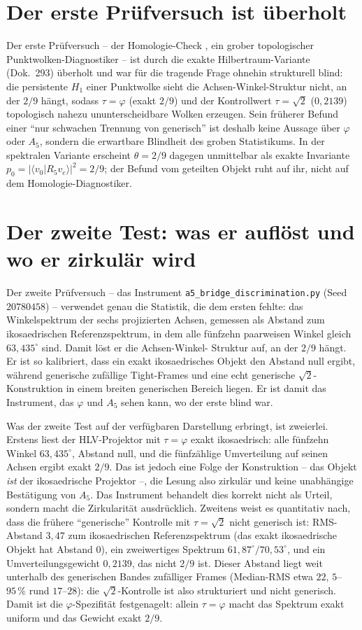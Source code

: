 \section{Der erste Prüfversuch ist überholt}
Der erste Prüfversuch -- der Homologie-Check , ein
grober topologischer Punktwolken-Diagnostiker -- ist durch die exakte Hilbertraum-Variante
(Dok.~293) überholt und war für die tragende Frage ohnehin strukturell blind: die persistente
$H_1$ einer Punktwolke sieht die Achsen-Winkel-Struktur nicht, an der $2/9$ hängt, sodass
$\tau=\varphi$ (exakt $2/9$) und der Kontrollwert $\tau=\sqrt2$ ($0{,}2139$) topologisch nahezu
ununterscheidbare Wolken erzeugen. Sein früherer Befund einer \enquote{nur schwachen Trennung
von generisch} ist deshalb keine Aussage über $\varphi$ oder $A_5$, sondern die erwartbare
Blindheit des groben Statistikums. In der spektralen Variante erscheint $\theta=2/9$ dagegen
unmittelbar als exakte Invariante $p_0=\lvert\langle v_0|R_5 v_e\rangle\rvert^2=2/9$; der Befund
vom geteilten Objekt ruht auf ihr, nicht auf dem Homologie-Diagnostiker.

\section{Der zweite Test: was er auflöst und wo er zirkulär wird}
Der zweite Prüfversuch -- das Instrument \texttt{a5\_bridge\_discrimination.py}
(Seed $20780458$) -- verwendet genau die Statistik, die dem ersten fehlte: das Winkelspektrum
der sechs projizierten Achsen, gemessen als Abstand zum ikosaedrischen Referenzspektrum, in dem
alle fünfzehn paarweisen Winkel gleich $63{,}435^\circ$ sind. Damit löst er die Achsen-Winkel-
Struktur auf, an der $2/9$ hängt. Er ist so kalibriert, dass ein exakt ikosaedrisches Objekt den
Abstand null ergibt, während generische zufällige Tight-Frames und eine echt generische
$\sqrt2$-Konstruktion in einem breiten generischen Bereich liegen. Er ist damit das Instrument,
das $\varphi$ und $A_5$ sehen kann, wo der erste blind war.

Was der zweite Test auf der verfügbaren Darstellung erbringt, ist zweierlei. Erstens liest der
HLV-Projektor mit $\tau=\varphi$ exakt ikosaedrisch: alle fünfzehn Winkel $63{,}435^\circ$,
Abstand null, und die fünfzählige Umverteilung auf seinen Achsen ergibt exakt $2/9$. Das ist
jedoch eine Folge der Konstruktion -- das Objekt \emph{ist} der ikosaedrische Projektor --, die
Lesung also zirkulär und keine unabhängige Bestätigung von $A_5$. Das Instrument behandelt dies
korrekt nicht als Urteil, sondern macht die Zirkularität ausdrücklich. Zweitens weist es
quantitativ nach, dass die frühere \enquote{generische} Kontrolle mit $\tau=\sqrt2$ nicht
generisch ist: RMS-Abstand $3{,}47$ zum ikosaedrischen Referenzspektrum (das exakt
ikosaedrische Objekt hat Abstand $0$), ein zweiwertiges Spektrum $61{,}87^\circ/70{,}53^\circ$, und
ein Umverteilungsgewicht $0{,}2139$, das nicht $2/9$ ist. Dieser Abstand liegt weit unterhalb des
generischen Bandes zufälliger Frames (Median-RMS etwa $22$, $5$--$95\,\%$ rund $17$--$28$): die
$\sqrt2$-Kontrolle ist also strukturiert und nicht generisch. Damit ist die $\varphi$-Spezifität
festgenagelt: allein $\tau=\varphi$ macht das Spektrum exakt uniform und das Gewicht exakt
$2/9$.

